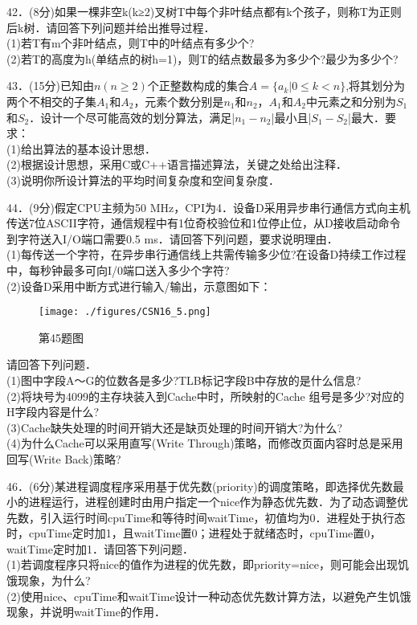 42．(8分)如果一棵非空k(k≥2)叉树T中每个非叶结点都有k个孩子，则称T为正则后k树．请回答下列问题并给出推导过程． \\
(1)若T有m个非叶结点，则T中的叶结点有多少个? \\
(2)若T的高度为h(单结点的树h=1)，则T的结点数最多为多少个?最少为多少个?

43．(15分)已知由$n(n \geqslant 2)$个正整数构成的集合$A=\{a_k|0\leqslant k<n\}$,将其划分为两个不相交的子集$A_1$和$A_2$，元素个数分别是$n_1$和$n_2$，$A_1$和$A_2$中元素之和分别为$S_1$和$S_2$．设计一个尽可能高效的划分算法，满足|$n_1-n_2$|最小且|$S_1-S_2$|最大．要求： \\
(1)给出算法的基本设计思想． \\
(2)根据设计思想，采用C或C++语言描述算法，关键之处给出注释． \\
(3)说明你所设计算法的平均时间复杂度和空间复杂度．

44．(9分)假定CPU主频为50 MHz，CPI为4．设备D采用异步串行通信方式向主机传送7位ASCII字符，通信规程中有1位奇校验位和1位停止位，从D接收启动命令到字符送入I/O端口需要0.5 ms．请回答下列问题，要求说明理由． \\
(1)每传送一个字符，在异步串行通信线上共需传输多少位?在设备D持续工作过程中，每秒钟最多可向I/0端口送入多少个字符? \\
(2)设备D采用中断方式进行输入/输出，示意图如下：
\begin{figure}[ht]
\centering
\texttt{[image: ./figures/CSN16\_5.png]}
\caption{第45题图} \label{CSN16_fig5}
\end{figure}
请回答下列问题． \\
(1)图中字段A～G的位数各是多少?TLB标记字段B中存放的是什么信息? \\
(2)将块号为4099的主存块装入到Cache中时，所映射的Cache 组号是多少?对应的H字段内容是什么? \\
(3)Cache缺失处理的时间开销大还是缺页处理的时间开销大?为什么? \\
(4)为什么Cache可以采用直写(Write Through)策略，而修改页面内容时总是采用回写(Write Back)策略?

46．(6分)某进程调度程序采用基于优先数(priority)的调度策略，即选择优先数最小的进程运行，进程创建时由用户指定一个nice作为静态优先数．为了动态调整优先数，引入运行时间cpuTime和等待时间waitTime，初值均为0．进程处于执行态时，cpuTime定时加1，且waitTime置0；进程处于就绪态时，cpuTime置0，waitTime定时加1．请回答下列问题． \\
(1)若调度程序只将nice的值作为进程的优先数，即priority=nice，则可能会出现饥饿现象，为什么? \\
(2)使用nice、cpuTime和waitTime设计一种动态优先数计算方法，以避免产生饥饿现象，并说明waitTime的作用．

